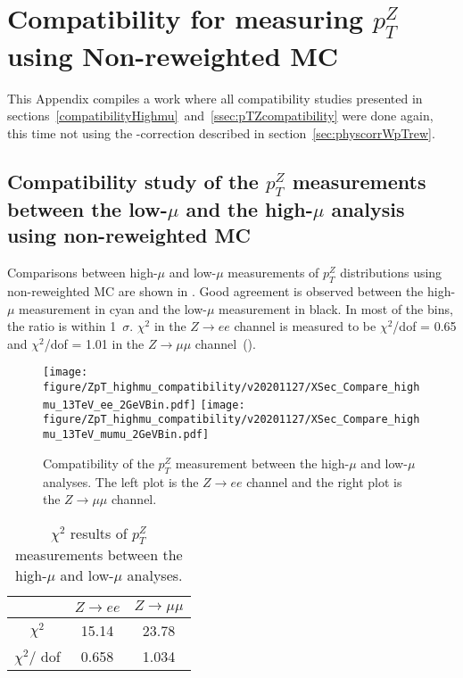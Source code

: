\section{Compatibility for measuring $p_{T}^{Z}$ using Non-reweighted MC}
\label{App:compatibility}

This Appendix compiles a work where all compatibility studies presented in sections~\ref{compatibilityHighmu}~and~\ref{ssec:pTZcompatibility} were done again, this time not using the \pt-correction described in section~\ref{sec:physcorrWpTrew}.

\subsection{Compatibility study of the $p_{T}^{Z}$ measurements between the low-$\mu$ and the high-$\mu$ analysis using non-reweighted MC}
\label{App:compatibility_lowhighMu}

Comparisons between high-$\mu$ and low-$\mu$ measurements of $p_{T}^{Z}$ distributions using non-reweighted MC are shown in \Fig{\ref{f:CompatibilityHighLowMu}}. Good agreement is observed between the high-$\mu$ measurement in cyan and the low-$\mu$ measurement in black. In most of the bins, the ratio is within 1~$\sigma$.
$\chi^2$ in the $Z\rightarrow ee$ channel is measured to be $\chi^2$/dof =  0.65 and $\chi^2$/dof = 1.01 in the $Z\rightarrow \mu\mu$ channel~(\Tab{\ref{tab:chi2highmu}}).

\begin{figure}[h]
  \centering
  \texttt{[image: figure/ZpT\_highmu\_compatibility/v20201127/XSec\_Compare\_highmu\_13TeV\_ee\_2GeVBin.pdf]}
   \texttt{[image: figure/ZpT\_highmu\_compatibility/v20201127/XSec\_Compare\_highmu\_13TeV\_mumu\_2GeVBin.pdf]}
  \caption{Compatibility of the $p_{T}^{Z}$ measurement between the high-$\mu$ and low-$\mu$ analyses. The left plot is the $Z\rightarrow ee$ channel and the right plot is the $Z\rightarrow \mu\mu$ channel.}
    \label{f:CompatibilityHighLowMu}
\end{figure}

\begin{table}[h]
 \centering
\begin{tabular}{|c|c|c|}
\hline
  & $Z\rightarrow ee$ & $Z\rightarrow \mu\mu$\\
 \hline
 $\chi^2$ & 15.14 & 23.78 \\
 \hline
$\chi^2/$ dof & 0.658 & 1.034\\
\hline
\end{tabular}
\caption{$\chi^2$ results of $p_{T}^{Z}$ measurements between the high-$\mu$ and low-$\mu$ analyses.}
\label{tab:chi2highmu}
\end{table}

